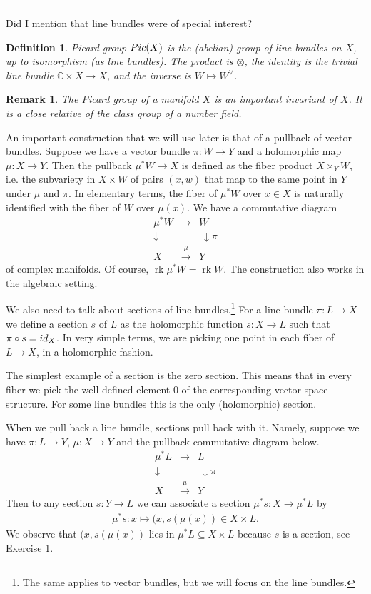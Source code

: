 \documentclass[11pt]{article}
\numberwithin{equation}{section}
\numberwithin{footnote}{section}
\newtheorem{defn}[thm]{Definition}
\newtheorem{rem}[thm]{Remark}
\newcommand{\blue}{\color{blue}}
\newcommand{\C}{{\mathbb C}}
\DeclareMathOperator{\rk}{rk}
\begin{document}
\smallskip
{\blue \hrule}

Did I mention that line bundles were of special interest? 

\smallskip
\begin{defn}
Picard group ${\rm Pic}(X)$ is the (abelian) group of line bundles on $X$, up to isomorphism (as line bundles). The product is $\otimes$, the identity is the trivial line bundle $\C\times X\to X$, and the inverse is $W\mapsto W^\vee$.
\end{defn}

\smallskip
\begin{rem}
The Picard group of a manifold $X$ is an important invariant of $X$. It is a close relative of the class group of a number field. 
\end{rem}

\smallskip
An important construction that we will use later is that of a {\blue pullback} of vector bundles. Suppose we have a vector bundle $\pi:W\to Y$ and a holomorphic map $\mu:X\to Y$. Then the pullback $\mu^*W\to X$ is defined as the fiber product $X\times_Y W$, i.e. the subvariety in $X\times W$ of pairs $(x,w)$ that map to the same point in $Y$ under $\mu$ and $\pi$. In elementary terms, the fiber of $\mu^* W$ over $x\in X$ is naturally identified with the fiber of $W$ over $\mu(x)$. We have a commutative diagram
$$
\begin{array}{ccc}
\mu^*W &\longrightarrow &W\\
\downarrow&&~\downarrow \pi\\
X&\stackrel \mu\longrightarrow&Y
\end{array}
$$
of complex manifolds. Of course, $\rk \mu^*W = \rk W$. The construction also works in the algebraic setting.

\smallskip
We also need to talk about sections of line bundles.\footnote{The same applies to vector bundles, but we will focus on the line bundles.}
For a line bundle $\pi:L\to X$ we define a section $s$ of $L$ as the holomorphic function $s:X\to L$ such that $\pi\circ s= {\rm id}_X$.
In very simple terms, we are picking one point in each fiber of $L\to X$, in a holomorphic fashion.

\smallskip
The simplest example of a section is the {\blue zero section}. This means that in every fiber we pick the well-defined element $0$ of the corresponding vector space structure. For some line bundles this is the only (holomorphic) section.

\smallskip
When we pull back a line bundle, sections pull back with it. Namely, suppose we have $\pi:L\to Y$, $\mu:X\to Y$ and
the pullback commutative diagram below.
$$
\begin{array}{ccc}
\mu^*L &\longrightarrow &L\\
\downarrow&&~\downarrow \pi\\
X&\stackrel \mu\longrightarrow&Y
\end{array}
$$
Then to any section $s:Y\to L$ we can associate a section $\mu^* s:X\to \mu^* L$ by
\begin{align}\label{mus}
\mu^*s:x\mapsto (x, s(\mu(x)) \in  X\times L.
\end{align}
We observe that $(x,s(\mu(x))$ lies in $\mu^*L\subseteq X\times L$ because $s$ is a section, see Exercise 1.
\end{document}
